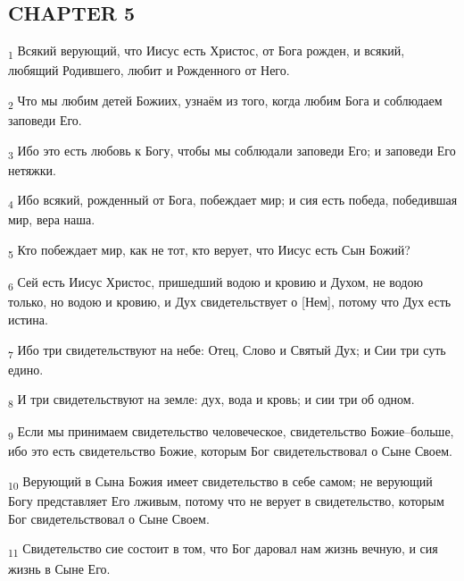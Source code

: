 \subsection{CHAPTER 5}
\begin{tcolorbox}
\textsubscript{1} Всякий верующий, что Иисус есть Христос, от Бога рожден, и всякий, любящий Родившего, любит и Рожденного от Него.
\end{tcolorbox}
\begin{tcolorbox}
\textsubscript{2} Что мы любим детей Божиих, узнаём из того, когда любим Бога и соблюдаем заповеди Его.
\end{tcolorbox}
\begin{tcolorbox}
\textsubscript{3} Ибо это есть любовь к Богу, чтобы мы соблюдали заповеди Его; и заповеди Его нетяжки.
\end{tcolorbox}
\begin{tcolorbox}
\textsubscript{4} Ибо всякий, рожденный от Бога, побеждает мир; и сия есть победа, победившая мир, вера наша.
\end{tcolorbox}
\begin{tcolorbox}
\textsubscript{5} Кто побеждает мир, как не тот, кто верует, что Иисус есть Сын Божий?
\end{tcolorbox}
\begin{tcolorbox}
\textsubscript{6} Сей есть Иисус Христос, пришедший водою и кровию и Духом, не водою только, но водою и кровию, и Дух свидетельствует о [Нем], потому что Дух есть истина.
\end{tcolorbox}
\begin{tcolorbox}
\textsubscript{7} Ибо три свидетельствуют на небе: Отец, Слово и Святый Дух; и Сии три суть едино.
\end{tcolorbox}
\begin{tcolorbox}
\textsubscript{8} И три свидетельствуют на земле: дух, вода и кровь; и сии три об одном.
\end{tcolorbox}
\begin{tcolorbox}
\textsubscript{9} Если мы принимаем свидетельство человеческое, свидетельство Божие--больше, ибо это есть свидетельство Божие, которым Бог свидетельствовал о Сыне Своем.
\end{tcolorbox}
\begin{tcolorbox}
\textsubscript{10} Верующий в Сына Божия имеет свидетельство в себе самом; не верующий Богу представляет Его лживым, потому что не верует в свидетельство, которым Бог свидетельствовал о Сыне Своем.
\end{tcolorbox}
\begin{tcolorbox}
\textsubscript{11} Свидетельство сие состоит в том, что Бог даровал нам жизнь вечную, и сия жизнь в Сыне Его.
\end{tcolorbox}
